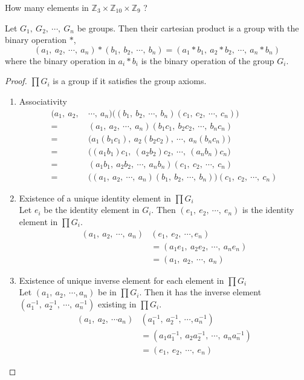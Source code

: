 \begin{question}
	How many elements in $\mathbb{Z}_3 \times \mathbb{Z}_{10} \times \mathbb{Z}_9$ ?
\end{question}

\begin{theorem}
	Let $G_1,\ G_2,\ \cdots,\ G_n$ be groups.
	Then their cartesian product is a group with the binary operation $\ast$,
	$$ (a_1,\ a_2,\ \cdots,\ a_n) \ast (b_1,\ b_2,\ \cdots,\ b_n) = (a_1 \ast b_1,\ a_2 \ast b_2,\ \cdots,\ a_n \ast b_n) $$
	where the binary operation in  $a_i \ast b_i$ is the binary operation of the group $G_i$.
\end{theorem}
\begin{proof}
	$\prod G_i$ is a group if it satisfies the group axioms.
	\begin{enumerate}[label=G\arabic*]
		\item Associativity
			\begin{align*}
				(a_1,\ a_2,\ & \cdots,\ a_n) \big( (b_1,\ b_2,\ \cdots,\ b_n)(c_1,\ c_2,\ \cdots,\ c_n) \big) \\
				= & (a_1,\ a_2,\ \cdots,\ a_n)(b_1c_1,\ b_2c_2,\ \cdots,\ b_nc_n) \\
				= & \big( a_1(b_1c_1),\ a_2(b_2c_2),\ \cdots,\ a_n(b_nc_n) \big) \\
				= & \big( (a_1 b_1)c_1,\ (a_2b_2)c_2,\ \cdots,\ (a_nb_n )c_n \big) \\
				= &  (a_1b_1,\ a_2b_2,\ \cdots,\ a_nb_n)(c_1,\ c_2,\ \cdots,\ c_n) \\
				= & \big( (a_1,\ a_2,\ \cdots,\ a_n)(b_1,\ b_2,\ \cdots,\ b_n) \big)(c_1,\ c_2,\ \cdots,\ c_n)
			\end{align*}
		\item Existence of a unique identity element in $\prod G_i$\\
			Let $e_i$ be the identity element in $G_i$.
			Then $(e_1,\ e_2,\ \cdots,\ e_n)$ is the identity element in $\prod G_i$.
			\begin{align*}
				(a_1,\ a_2,\ \cdots,\ a_n)&(e_1,\ e_2,\ \cdots, e_n) \\
				& = (a_1e_1,\ a_2e_2,\ \cdots,\ a_ne_n) \\
				& = (a_1,\ a_2,\ \cdots,\ a_n)
			\end{align*}
		\item Existence of unique inverse element for each element in $\prod G_i$\\
			Let $(a_1,\ a_2,\ \cdots, a_n)$ be in $\prod G_i$.
			Then it has the inverse element $( a_1^{-1},\ a_2^{-1},\ \cdots,\ a_n^{-1} )$ existing in $\prod G_i$.
			\begin{align*}
				(a_1,\ a_2,\ \cdots a_n)&(a_1^{-1},\ a_2^{-1},\ \cdots, a_n^{-1}) \\
				& = (a_1a_1^{-1},\ a_2a_2^{-1},\ \cdots,\ a_na_n^{-1}) \\
				& = (e_1,\ e_2,\ \cdots,\ e_n)
			\end{align*}
	\end{enumerate}
\end{proof}

